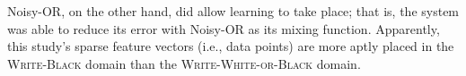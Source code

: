 Noisy-OR, on the other hand, did allow learning to take place; that is, the system was able to reduce its error with Noisy-OR as its mixing function. Apparently, this study's sparse feature vectors (i.e., data points) are more aptly placed in the \textsc{Write-Black} domain than the \textsc{Write-White-or-Black} domain.



